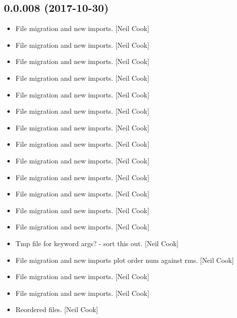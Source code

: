 \documentclass[a4paper,10pt,english]{report}
\begin{document}
\subsection{0.0.008 (2017-10-30)}
\label{\detokenize{misc/changelog:id542}}\begin{itemize}
\item {} 
File migration and new imports. {[}Neil Cook{]}

\item {} 
File migration and new imports. {[}Neil Cook{]}

\item {} 
File migration and new imports. {[}Neil Cook{]}

\item {} 
File migration and new imports. {[}Neil Cook{]}

\item {} 
File migration and new imports. {[}Neil Cook{]}

\item {} 
File migration and new imports. {[}Neil Cook{]}

\item {} 
File migration and new imports. {[}Neil Cook{]}

\item {} 
File migration and new imports. {[}Neil Cook{]}

\item {} 
File migration and new imports. {[}Neil Cook{]}

\item {} 
File migration and new imports. {[}Neil Cook{]}

\item {} 
File migration and new imports. {[}Neil Cook{]}

\item {} 
File migration and new imports. {[}Neil Cook{]}

\item {} 
File migration and new imports. {[}Neil Cook{]}

\item {} 
Tmp file for keyword args? - sort this out. {[}Neil Cook{]}

\item {} 
File migration and new imports plot order num against rms. {[}Neil Cook{]}

\item {} 
File migration and new imports. {[}Neil Cook{]}

\item {} 
File migration and new imports. {[}Neil Cook{]}

\item {} 
Reordered files. {[}Neil Cook{]}

\end{itemize}
\end{document}
